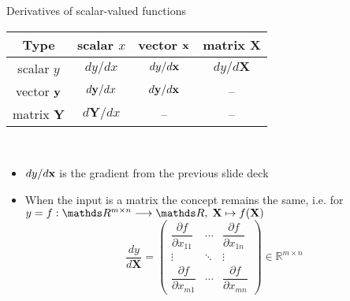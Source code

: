 \documentclass[11pt,compress,t,notes=noshow, xcolor=table]{beamer}
\newcommand{\deriv}{d}
\begin{document}
\begin{vbframe}{Derivatives of scalar-valued functions}
        \vspace{0.5\baselineskip}
        \begin{table}
            \centering
            \begin{tabular}{c||c|c|c}
                 Type & scalar $x$ & vector $\mathbf{x}$ & matrix $\mathbf{X}$ \\ \hline\hline
                 scalar $y$ & $\deriv y / \deriv x$ & \cellcolor{customblue}$\deriv y / \deriv\xv$ & \cellcolor{customblue}$\deriv y / \deriv\mathbf{X}$ \\ \hline
                 vector $\mathbf{y}$ & $\deriv\yv / \deriv x$ & $\deriv\yv / \deriv\xv$ & -- \\ \hline
                 matrix $\mathbf{Y}$ & $\deriv\mathbf{Y} / \deriv x$ & -- & --
            \end{tabular}
        \end{table}\,\\
        \begin{itemize}
        \item $\deriv y / \deriv\xv$ is the gradient from the previous slide deck\\[\baselineskip]
            \item When the input is a matrix the concept remains the same, i.e. for $y= f:\R^{m\times n}\longrightarrow\R,\; \mathbf{X}\mapsto f(\mathbf{X})$
$$
\frac{\deriv y}{\deriv\bm{X}}= \left(\begin{array}{ccc}
\dfrac{\partial f}{\partial x_{11}} & \cdots & \dfrac{\partial f}{\partial x_{1 n}} \\
\vdots & \ddots & \vdots \\
\dfrac{\partial f}{\partial x_{m 1}} & \cdots & \dfrac{\partial f }{\partial x_{m n}}
\end{array}\right) \in \mathbb{R}^{m \times n}
$$
        \end{itemize}
\end{vbframe}
\end{document}
